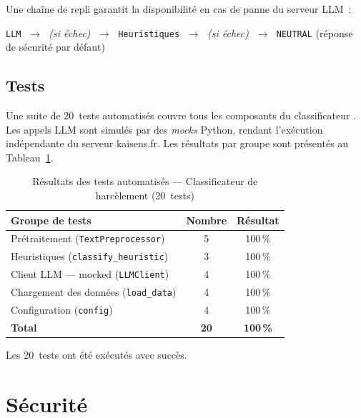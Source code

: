Une chaîne de repli garantit la disponibilité en cas de panne du serveur LLM~:

\begin{center}
\texttt{LLM} $\;\longrightarrow\;$ \textit{(si échec)}
$\;\longrightarrow\;$ \texttt{Heuristiques}
$\;\longrightarrow\;$ \textit{(si échec)}
$\;\longrightarrow\;$ \texttt{NEUTRAL} (réponse de sécurité par défaut)
\end{center}

\subsection{Tests}

Une suite de 20~tests automatisés couvre tous les composants du classificateur \cite{pytest}.
Les appels LLM sont simulés par des \emph{mocks} Python, rendant l'exécution indépendante
du serveur kaisens.fr. Les résultats par groupe sont présentés au Tableau~\ref{tab:tests_classif}.

\vspace{6pt}
\begin{table}[H]
\centering
\caption{Résultats des tests automatisés — Classificateur de harcèlement (20~tests)}
\label{tab:tests_classif}
\begin{tabular}{|l|c|c|}
\hline
\textbf{Groupe de tests} & \textbf{Nombre} & \textbf{Résultat} \\
\hline
Prétraitement (\texttt{TextPreprocessor})       & 5 & 100\,\% \\
\hline
Heuristiques (\texttt{classify\_heuristic})     & 3 & 100\,\% \\
\hline
Client LLM — mocked (\texttt{LLMClient})        & 4 & 100\,\% \\
\hline
Chargement des données (\texttt{load\_data})    & 4 & 100\,\% \\
\hline
Configuration (\texttt{config})                 & 4 & 100\,\% \\
\hline
\textbf{Total} & \textbf{20} & \textbf{100\,\%} \\
\hline
\end{tabular}
\end{table}

Les 20~tests ont été exécutés avec succès.

\section{Sécurité}
\label{sec:securite_donnees}

